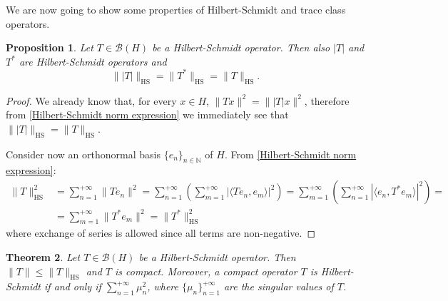 \documentclass[corpo=11pt, stile=classica, tipotesi=custom,
greek, evenboxes, english]{toptesi}
\numberwithin{equation}{chapter}
\newtheorem{teo}{Theorem}[chapter] %
\newtheorem{prop}[teo]{Proposition}
\theoremstyle{remark}
\newcommand{\N}{\mathbb{N}} %
\newcommand{\B}{\mathscr{B}} %
\begin{document}
We are now going to show some properties of Hilbert-Schmidt and trace class operators.
\begin{prop}\label{|T| and T^* are Hilbert-Schmidt}
	Let $T \in \B(H)$ be a Hilbert-Schmidt operator. Then also $|T|$ and $T^*$ are Hilbert-Schmidt operators and 
	\begin{equation}\label{Hilbert-Schmidt norm of |T| and T^*}
		\| |T| \|_{\mathrm{HS}} = \| T^* \|_{\mathrm{HS}} = \| T \|_{\mathrm{HS}}.
	\end{equation}
\end{prop}
\begin{proof}
	We already know that, for every $x \in H$, $\|Tx\|^2 = \||T|x\|^2$, therefore from \eqref{Hilbert-Schmidt norm expression} we immediately see that $ \| |T| \|_{\mathrm{HS}} = \| T \|_{\mathrm{HS}}$.
	
	Consider now an orthonormal basis $\{e_n\}_{n \in \N}$ of $H$. From \eqref{Hilbert-Schmidt norm expression}:
	\begin{align*}
		\|T\|_{\mathrm{HS}}^2 &= \sum_{n=1}^{+\infty} \|Te_n\|^2 = \sum_{n=1}^{+\infty} \left(\sum_{m=1}^{+\infty} |\langle Te_n,e_m \rangle|^2\right) = \sum_{m=1}^{+\infty} \left(\sum_{n=1}^{+\infty} |\langle e_n, T^*e_m \rangle|^2\right) =\\
							&= \sum_{m=1}^{+\infty} \|T^* e_m\|^2 = \|T^*\|_{\mathrm{HS}}^2
	\end{align*}
	where exchange of series is allowed since all terms are non-negative.
\end{proof}
\begin{teo}\label{Hilbert-Schmidt operators are compact and bounded}
	Let $T \in \B(H)$ be a Hilbert-Schmidt operator. Then $\|T\| \leq \|T\|_{\mathrm{HS}}$ and $T$ is compact. Moreover, a compact operator $T$ is Hilbert-Schmidt if and only if $\sum_{n=1}^{+\infty} \mu_n^2$, where $\{\mu_n\}_{n=1}^{+\infty}$ are the singular values of $T$.
\end{teo}
\end{document}
